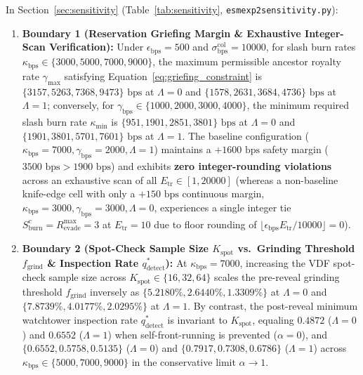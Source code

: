 \documentclass[runningheads,a4paper]{llncs}
\renewcommand{\_}{\textunderscore\allowbreak}
\begin{document}
In Section~\ref{sec:sensitivity} (Table~\ref{tab:sensitivity}, \texttt{esm\_exp2\_sensitivity.py}):
\begin{enumerate}
  \item \textbf{Boundary 1 (Reservation Griefing Margin \& Exhaustive Integer-Scan Verification):} Under $\epsilon_{\text{bps}} = 500$ and $\sigma_{\text{bps}}^{\text{col}} = 10000$, for slash burn rates $\kappa_{\text{bps}} \in \{3000,\allowbreak 5000,\allowbreak 7000,\allowbreak 9000\}$, the maximum permissible ancestor royalty rate $\gamma_{\max}$ satisfying Equation~\eqref{eq:griefing_constraint} is $\{3157,\allowbreak 5263,\allowbreak 7368,\allowbreak 9473\}\text{ bps}$ at $\Lambda = 0$ and $\{1578,\allowbreak 2631,\allowbreak 3684,\allowbreak 4736\}\text{ bps}$ at $\Lambda = 1$; conversely, for $\gamma_{\text{bps}} \in \{1000,\allowbreak 2000,\allowbreak 3000,\allowbreak 4000\}$, the minimum required slash burn rate $\kappa_{\min}$ is $\{951,\allowbreak 1901,\allowbreak 2851,\allowbreak 3801\}\text{ bps}$ at $\Lambda = 0$ and $\{1901,\allowbreak 3801,\allowbreak 5701,\allowbreak 7601\}\text{ bps}$ at $\Lambda = 1$. The baseline configuration ($\kappa_{\text{bps}} = 7000,\allowbreak \gamma_{\text{bps}} = 2000,\allowbreak \Lambda = 1$) maintains a $+1600\text{ bps}$ safety margin ($3500\text{ bps} > 1900\text{ bps}$) and exhibits \textbf{zero integer-rounding violations} across an exhaustive scan of all $E_{\text{tr}} \in [1,\allowbreak 20000]$ (whereas a non-baseline knife-edge cell with only a $+150\text{ bps}$ continuous margin, $\kappa_{\text{bps}} = 3000,\allowbreak \gamma_{\text{bps}} = 3000,\allowbreak \Lambda = 0$, experiences a single integer tie $S_{\text{burn}}^c = R_{\text{evade}}^{\max} = 3$ at $E_{\text{tr}} = 10$ due to floor rounding of $\lfloor \epsilon_{\text{bps}} E_{\text{tr}} / 10000 \rfloor = 0$).
  \item \textbf{Boundary 2 (Spot-Check Sample Size $K_{\text{spot}}$ vs.\ Grinding Threshold $f_{\text{grind}}$ \& Inspection Rate $q_{\text{detect}}^*$):} At $\kappa_{\text{bps}} = 7000$, increasing the VDF spot-check sample size across $K_{\text{spot}} \in \{16,\allowbreak 32,\allowbreak 64\}$ scales the pre-reveal grinding threshold $f_{\text{grind}}$ inversely as $\{5.2180\%,\allowbreak 2.6440\%,\allowbreak 1.3309\%\}$ at $\Lambda = 0$ and $\{7.8739\%,\allowbreak 4.0177\%,\allowbreak 2.0295\%\}$ at $\Lambda = 1$. By contrast, the post-reveal minimum watchtower inspection rate $q_{\text{detect}}^*$ is invariant to $K_{\text{spot}}$, equaling $0.4872$ ($\Lambda = 0$) and $0.6552$ ($\Lambda = 1$) when self-front-running is prevented ($\alpha = 0$), and $\{0.6552,\allowbreak 0.5758,\allowbreak 0.5135\}$ ($\Lambda = 0$) and $\{0.7917,\allowbreak 0.7308,\allowbreak 0.6786\}$ ($\Lambda = 1$) across $\kappa_{\text{bps}} \in \{5000,\allowbreak 7000,\allowbreak 9000\}$ in the conservative limit $\alpha \to 1$.

\end{enumerate}
\end{document}
